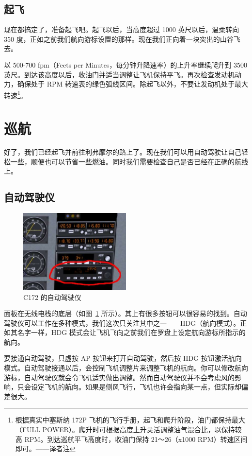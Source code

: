 \subsection{起飞}

现在都搞定了，准备起飞吧。起飞以后，当高度超过 1000 英尺以后，温柔转向 350 度，正如之前我们航向游标设置的那样。现在我们正向着一块突出的山谷飞去。

以 500-700 fpm（Feets per Minutes，每分钟升降速率）的上升率继续爬升到 3500 英尺。到达该高度以后，收油门并适当调整让飞机保持平飞。再次检查发动机动力，确保处于 RPM 转速表的绿色弧线区间。除起飞以外，不要让发动机处于最大转速\footnote{根据真实中塞斯纳 172P 飞机的飞行手册，起飞和爬升阶段，油门都保持最大（FULL POWER）。爬升时可根据高度上升灵活调整油气混合比，以保持较高 RPM。到达巡航平飞高度时，收油门保持 21～26（x1000 RPM）转速区间即可。——译者注}。

\section{巡航}

好了，我们已经起飞并前往利弗摩尔的路上了。现在我们可以用自动驾驶让自己轻松一些，顺便也可以节省一些燃油。同时我们需要检查自己是否已经在正确的航线上。

\subsection{自动驾驶仪}

\begin{figure}[!htp]
\centering
\includegraphics[width=0.5\textwidth]{autopilot}
\caption{C172 的自动驾驶仪\label{autopilot}}
\end{figure}

面板在无线电栈的底层（如图~\ref{autopilot} 所示）。其上有很多按钮可以很容易的找到。自动驾驶仪可以工作在多种模式，我们这次只关注其中之一——HDG（航向模式）。正如其名字一样，HDG 模式会让飞机飞向之前我们在罗盘上设定航向游标所指示的航向。

要接通自动驾驶，只虚按 AP 按钮来打开自动驾驶，然后按 HDG 按钮激活航向模式。自动驾驶接通以后，会控制飞机调整片来调整飞机的航向。你可以修改航向游标，自动驾驶仪就会令飞机适实做出调整。然而自动驾驶仪并不会考虑风的影响，只会设定飞机的航向。如果是侧风飞行，飞机也许会指向某一点，但实际却偏差很大。

